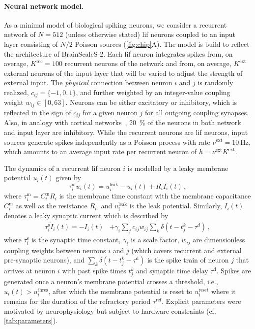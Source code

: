 \paragraph{Neural network model.}
\label{sec:model}
As a minimal model of biological spiking neurons, we consider a recurrent network of $N=512$ (unless otherwise stated) \gls{lif} neurons coupled to an input layer consisting of $N/2$ Poisson sources (\cref{fig:chip}A).
The model is build to reflect the architecture of BrainScaleS-2.
Each \gls{lif} neuron integrates spikes from, on average, $K^\mathrm{rec}=100$ recurrent neurons of the network and from, on average, $K^\mathrm{ext}$ external neurons of the input layer that will be varied to adjust the strength of external input.
The \emph{physical} connection between neuron $i$ and $j$ is randomly realized, $c_{ij}=\{-1,0,1\}$, and further weighted by an integer-value coupling weight $w_{ij}\in[0, 63]$.
Neurons can be either excitatory or inhibitory, which is reflected in the sign of $c_{ij}$ for a given neuron $j$ for all outgoing coupling synapses.
Also, in analogy with cortical networks~\cite{douglas_inhibition_2009}, \SI{20}{\percent} of the neurons in both network and input layer are inhibitory.
While the recurrent neurons are \gls{lif} neurons, input sources generate spikes independently as a Poisson process with rate $\nu^\mathrm{ext}=\SI{10}{\hertz}$, which amounts to an average input rate per recurrent neuron of $h=\nu^\mathrm{ext}K^\mathrm{ext}$.

The dynamics of a recurrent \gls{lif} neuron $i$ is modelled by a leaky membrane potential $u_i(t)$ given by
\begin{equation}
	\tau^\mathrm{m}_i\dot{u}_i(t) = u_i^\mathrm{leak}-u_i(t) + R_i I_i(t)\, , \label{eq:membrane}
\end{equation}
%
where $\tau^\mathrm{m}_i = C_i^\mathrm{m} R_i$ is the membrane time constant with the membrane capacitance $C_i^\mathrm{m}$ as well as the resistance $R_i$, and $u_i^\mathrm{leak}$ is the leak potential.
%
Similarly, $I_i(t)$ denotes a leaky synaptic current which is described by
\begin{align}
    \tau^\mathrm{s}_i\dot{I}_i(t) = -I_i(t) &+ \gamma_i\sum_j c_{ij}w_{ij}\sum_k\delta(t-t_j^k-\tau^d)\, , \label{eq:synapse}
\end{align}
%
where $\tau^\mathrm{s}_i$ is the synaptic time constant, $\gamma_i$ is a scale factor, $w_{ij}$ are dimensionless coupling weights between neurons $i$ and $j$ (which covers recurrent and external pre-synaptic neurons), and $\sum_k\delta(t-t_j^k-\tau^\mathrm{d})$ is the spike train of neuron $j$ that arrives at neuron $i$ with past spike times $t_j^k$ and synaptic time delay $\tau^\mathrm{d}$.
Spikes are generated once a neuron's membrane potential crosses a threshold, i.e., $u_i(t)>u_i^\mathrm{thres}$, after which the membrane potential is reset to $u_i^\mathrm{reset}$ where it remains for the duration of the refractory period $\tau^\mathrm{ref}$.
Explicit parameters were motivated by neurophysiology but subject to hardware constraints (cf. \cref{tab:parameters}).

